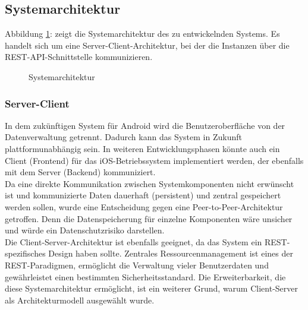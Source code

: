\subsection{Systemarchitektur}
Abbildung \ref{img:Systemarchitektur}: \glqq {}\grqq{} zeigt die Systemarchitektur des zu entwickelnden Systems. Es handelt sich um eine Server-Client-Architektur, bei der die Instanzen über die REST-API-Schnittstelle kommunizieren.
\begin{figure}[H]
	\centering
	\setlength{\fboxsep}{1pt}
	\setlength{\fboxrule}{1pt}
	\captionsetup{justification=centering}
	\caption{Systemarchitektur}
	\label{img:Systemarchitektur}
\end{figure}
\subsubsection{Server-Client}
	In dem zukünftigen System für Android wird die Benutzeroberfläche von der Datenverwaltung getrennt. Dadurch kann das System in Zukunft plattformunabhängig sein. In weiteren Entwicklungsphasen könnte auch ein Client (Frontend) für das iOS-Betriebssystem implementiert werden, der ebenfalls mit dem Server (Backend) kommuniziert.\\
	Da eine direkte Kommunikation zwischen Systemkomponenten nicht erwünscht ist und kommunizierte Daten dauerhaft (persistent) und zentral gespeichert werden sollen, wurde eine Entscheidung gegen eine Peer-to-Peer-Architektur getroffen. Denn die Datenspeicherung für einzelne Komponenten wäre unsicher und würde ein Datenschutzrisiko darstellen.\\
	Die Client-Server-Architektur ist ebenfalls geeignet, da das System ein REST-spezifisches Design haben sollte. Zentrales Ressourcenmanagement ist eines der REST-Paradigmen, ermöglicht die Verwaltung vieler Benutzerdaten und gewährleistet einen bestimmten Sicherheitsstandard. Die Erweiterbarkeit, die diese Systemarchitektur ermöglicht, ist ein weiterer Grund, warum Client-Server als Architekturmodell ausgewählt wurde. 
